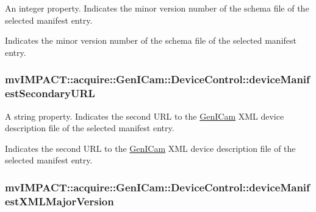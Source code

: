 An integer property. Indicates the minor version number of the schema file of the selected manifest entry. 

Indicates the minor version number of the schema file of the selected manifest entry. \hypertarget{classmv_i_m_p_a_c_t_1_1acquire_1_1_gen_i_cam_1_1_device_control_a3e45ae9eba3ba1a6af50a3a2f4f789c7}{
\subsubsection[{device\+Manifest\+Secondary\+U\+R\+L}]{ mv\+I\+M\+P\+A\+C\+T\+::acquire\+::\+Gen\+I\+Cam\+::\+Device\+Control\+::device\+Manifest\+Secondary\+U\+R\+L}}\label{classmv_i_m_p_a_c_t_1_1acquire_1_1_gen_i_cam_1_1_device_control_a3e45ae9eba3ba1a6af50a3a2f4f789c7}


A string property. Indicates the second U\+R\+L to the \hyperlink{namespacemv_i_m_p_a_c_t_1_1acquire_1_1_gen_i_cam}{Gen\+I\+Cam} X\+M\+L device description file of the selected manifest entry. 

Indicates the second U\+R\+L to the \hyperlink{namespacemv_i_m_p_a_c_t_1_1acquire_1_1_gen_i_cam}{Gen\+I\+Cam} X\+M\+L device description file of the selected manifest entry. \hypertarget{classmv_i_m_p_a_c_t_1_1acquire_1_1_gen_i_cam_1_1_device_control_aec803f5338cd284d08206c8881737ba2}{
\subsubsection[{device\+Manifest\+X\+M\+L\+Major\+Version}]{ mv\+I\+M\+P\+A\+C\+T\+::acquire\+::\+Gen\+I\+Cam\+::\+Device\+Control\+::device\+Manifest\+X\+M\+L\+Major\+Version}}\label{classmv_i_m_p_a_c_t_1_1acquire_1_1_gen_i_cam_1_1_device_control_aec803f5338cd284d08206c8881737ba2}


